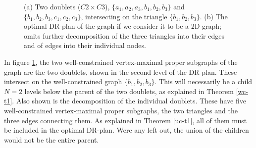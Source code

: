\begin{figure*}
\begin{subfigure}{.7\linewidth}

    \caption{}
\end{subfigure}

\caption{(a) Two doublets ($C2\times C3$), $\{a_1,a_2,a_3,b_1,b_2,b_3\}$ and $\{b_1,b_2,b_3,c_1,c_2,c_3\}$, intersecting on the triangle $\{b_1,b_2,b_3\}$. (b) The optimal DR-plan of the graph if we consider it to be a 2D graph; omits further decomposition of the three triangles into their edges and of edges into their individual nodes.}
\label{doublets}
\end{figure*}



\begin{example}
    In figure \ref{doublets}, the two well-constrained vertex-maximal proper subgraphs of the graph are the two doublets, shown in the second level of the DR-plan. These intersect on the well-constrained graph $\{b_1,b_2,b_3\}$. This will necessarily be a child $N=2$ levels below the parent of the two doublets, as explained in Theorem \ref{wc-t1}. Also shown is the decomposition of the individual doublets. These have five well-constrained vertex-maximal proper subgraphs, the two triangles and the three edges connecting them. As explained in Theorem \ref{uc-t1}, all of them must be included in the optimal DR-plan. Were any left out, the union of the children would not be the entire parent.
\end{example}



